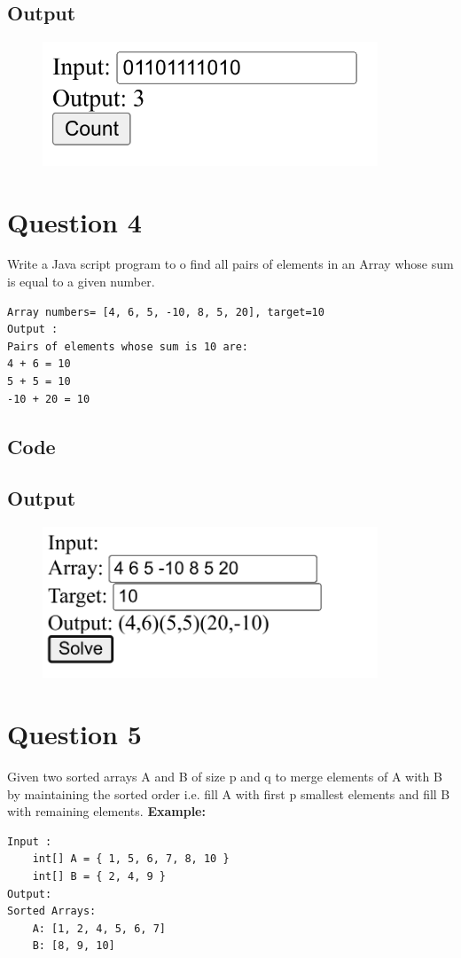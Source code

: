 \documentclass{article}
\begin{document}
\subsection*{Output}
\begin{figure}[H]
    \centering
    \includegraphics[width=10cm]{3/out.png}
\end{figure}

\newpage
\section*{Question 4}
Write a Java script program to o find all pairs of elements in an Array whose sum
is equal to a given number.
\begin{lstlisting}
Array numbers= [4, 6, 5, -10, 8, 5, 20], target=10
Output :
Pairs of elements whose sum is 10 are:
4 + 6 = 10
5 + 5 = 10
-10 + 20 = 10
\end{lstlisting}
\subsection*{Code}

\newpage
\subsection*{Output}
\begin{figure}[H]
    \centering
    \includegraphics[width=10cm]{4/out.png}
\end{figure}

\newpage
\section*{Question 5}
Given two sorted arrays A and B of size p and q to merge elements of A with B
by maintaining the sorted order i.e. fill A with first p smallest elements and fill B with
remaining elements.
\textbf{Example:}
\begin{lstlisting}
Input :
    int[] A = { 1, 5, 6, 7, 8, 10 }
    int[] B = { 2, 4, 9 }
Output:
Sorted Arrays:
    A: [1, 2, 4, 5, 6, 7]
    B: [8, 9, 10]
\end{lstlisting}
\end{document}
